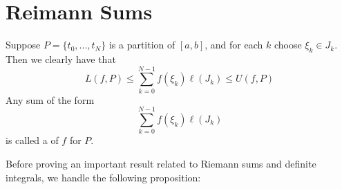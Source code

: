 \section{Reimann Sums}

\begin{defn}
    Suppose $P = \{t_0,...,t_N\}$ is a partition of $[a,b]$, and for each $k$ choose $\xi_k \in J_k$. Then we clearly have that \begin{equation}
        L(f,P) \leq \sum\limits_{k=0}^{N-1}f(\xi_k)\ell(J_k) \leq U(f,P)
    \end{equation}
    Any sum of the form \begin{equation}
        \sum\limits_{k=0}^{N-1}f(\xi_k)\ell(J_k)
    \end{equation}
    is called a  of $f$ for $P$.
\end{defn}


Before proving an important result related to Riemann sums and definite integrals, we handle the following proposition:

